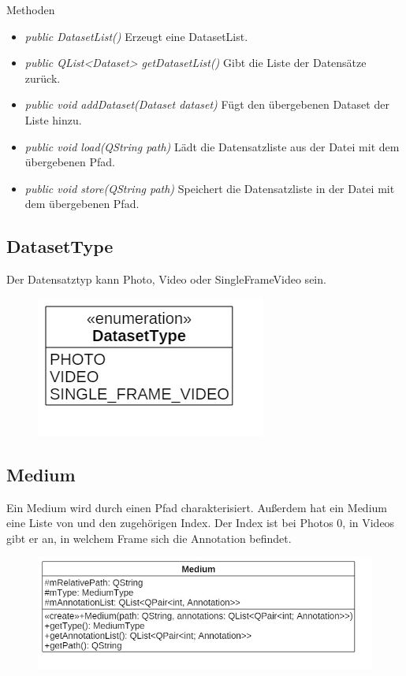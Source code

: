 Methoden
\begin{itemize}
\item \textit{public DatasetList()} Erzeugt eine DatasetList.
\item \textit{public QList<Dataset> getDatasetList()} Gibt die Liste der Datensätze zurück.
\item \textit{public void addDataset(Dataset dataset)} Fügt den übergebenen Dataset der Liste hinzu.
\item \textit{public void load(QString path)} Lädt die Datensatzliste aus der Datei mit dem übergebenen Pfad.
\item \textit{public void store(QString path)} Speichert die Datensatzliste in der Datei mit dem übergebenen Pfad.
\end{itemize}

\subsection*{DatasetType}
Der Datensatztyp kann Photo, Video oder SingleFrameVideo sein.

\begin{figure}[H]
\centering
\includegraphics[scale=0.5]{img/Klassendiagramm/Klassen/Model/DatasetType}
\label{fig:datasetType}
\end{figure}

\subsection*{Medium}
Ein Medium wird durch einen Pfad charakterisiert. Außerdem hat ein Medium eine Liste von  und den zugehörigen Index. Der Index ist bei Photos 0, in Videos gibt er an, in welchem Frame sich die \gls{Annotation} befindet.

\begin{figure}[H]
\centering
\includegraphics[scale=0.5]{img/Klassendiagramm/Klassen/Model/Medium}
\label{fig:medium}
\end{figure}

